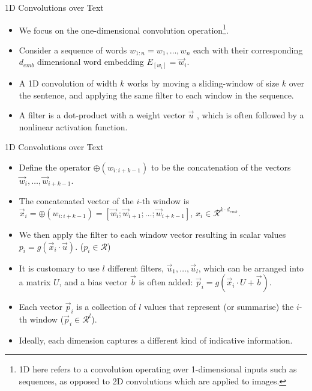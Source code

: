 \begin{frame}{1D Convolutions over Text}
\begin{scriptsize}
\begin{itemize}
\item We focus on the one-dimensional convolution operation\footnote{1D here refers to a convolution operating over 1-dimensional inputs such as sequences, as opposed to 2D convolutions which
are applied to images.}.
\item Consider a sequence of words $w_{1:n}=w_1 ,\dots,w_n$ each with their corresponding $d_{emb}$ dimensional word embedding $E_{[w_i]}=\vec{w}_{i}$.
\item A 1D convolution of width $k$ works by moving a sliding-window of size $k$ over the sentence, and applying the same filter to each window
in the sequence.
\item A filter is a dot-product with a weight vector $\vec{u}$ , which is often followed by a nonlinear activation function.
\end{itemize}
\end{scriptsize}
\end{frame}

\begin{frame}{1D Convolutions over Text}
\begin{scriptsize}
\begin{itemize}
\item Define the operator $\oplus (w_{i:i+k-1})$ to be the concatenation of the vectors $\vec{w}_{i}, \dots, \vec{w}_{i+k-1}$.
\item The concatenated vector of the $i$-th window is $\vec{x}_{i}=\oplus (w_{i:i+k-1}) = [\vec{w}_{i};\vec{w}_{i+1};\dots;\vec{w}_{i+k-1}]$, $x_{i} \in \mathcal{R}^{k \cdot d_{emb}}$.
\item We then apply the filter to each window vector resulting in scalar values $p_{i} =  g(\vec{x}_{i} \cdot \vec{u})$. ($p_{i} \in \mathcal{R}$)
\item It is customary to use $l$ different filters, $\vec{u}_1,\dots, \vec{u}_l$, which can be arranged into a matrix $U$, and a bias vector $\vec{b}$ is often added: $\vec{p}_{i}=g(\vec{x}_{i}\cdot U +\vec{b})$.

\item Each vector $\vec{p}_i$ is a collection of $l$ values that represent (or summarise) the $i$-th window ($\vec{p}_{i} \in \mathcal{R}^l$). 
\item Ideally, each dimension captures a different kind of indicative information.

\end{itemize}
\end{scriptsize}
\end{frame}


